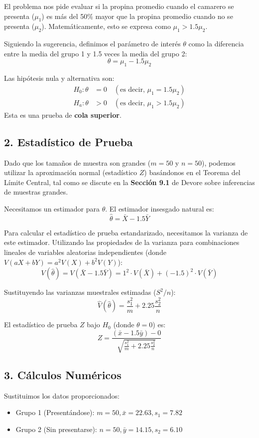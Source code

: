 \documentclass[12pt]{article}
\begin{document}
El problema nos pide evaluar si la propina promedio cuando el camarero se presenta ($\mu_1$) es más del 50\% mayor que la propina promedio cuando no se presenta ($\mu_2$). Matemáticamente, esto se expresa como $\mu_1 > 1.5\mu_2$.

Siguiendo la sugerencia, definimos el parámetro de interés $\theta$ como la diferencia entre la media del grupo 1 y 1.5 veces la media del grupo 2:
$$ \theta = \mu_1 - 1.5\mu_2 $$

Las hipótesis nula y alternativa son:
\begin{align*}
    H_0: \theta &= 0 \quad (\text{es decir, } \mu_1 = 1.5\mu_2) \\
    H_a: \theta &> 0 \quad (\text{es decir, } \mu_1 > 1.5\mu_2)
\end{align*}
Esta es una prueba de \textbf{cola superior}.

\subsection*{2. Estadístico de Prueba}

Dado que los tamaños de muestra son grandes ($m=50$ y $n=50$), podemos utilizar la aproximación normal (estadístico $Z$) basándonos en el Teorema del Límite Central, tal como se discute en la \textbf{Sección 9.1} de Devore sobre inferencias de muestras grandes.

Necesitamos un estimador para $\theta$. El estimador insesgado natural es:
$$ \hat{\theta} = \bar{X} - 1.5\bar{Y} $$

Para calcular el estadístico de prueba estandarizado, necesitamos la varianza de este estimador. Utilizando las propiedades de la varianza para combinaciones lineales de variables aleatorias independientes (donde $V(aX + bY) = a^2V(X) + b^2V(Y)$):
$$ V(\hat{\theta}) = V(\bar{X} - 1.5\bar{Y}) = 1^2 \cdot V(\bar{X}) + (-1.5)^2 \cdot V(\bar{Y}) $$

Sustituyendo las varianzas muestrales estimadas ($S^2/n$):
$$ \hat{V}(\hat{\theta}) = \frac{s_1^2}{m} + 2.25 \frac{s_2^2}{n} $$

El estadístico de prueba $Z$ bajo $H_0$ (donde $\theta = 0$) es:
$$ Z = \frac{(\bar{x} - 1.5\bar{y}) - 0}{\sqrt{\frac{s_1^2}{m} + 2.25 \frac{s_2^2}{n}}} $$

\subsection*{3. Cálculos Numéricos}

Sustituimos los datos proporcionados:
\begin{itemize}
    \item Grupo 1 (Presentándose): $m = 50, \bar{x} = 22.63, s_1 = 7.82$
    \item Grupo 2 (Sin presentarse): $n = 50, \bar{y} = 14.15, s_2 = 6.10$
\end{itemize}
\end{document}
